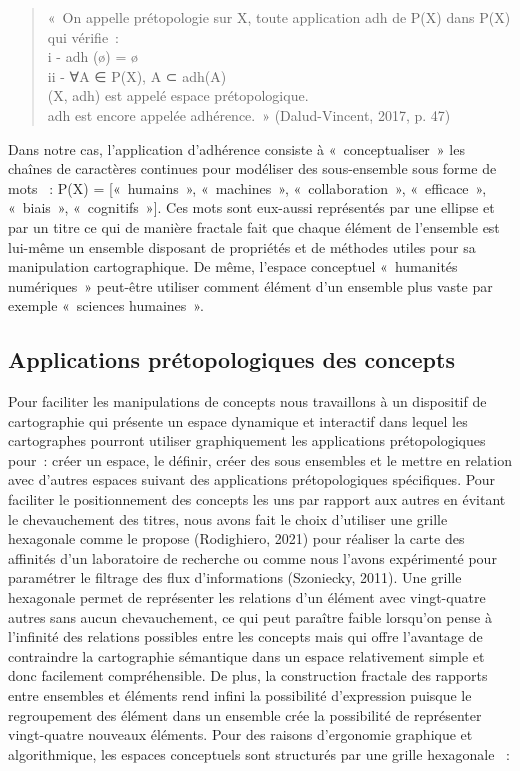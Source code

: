 \documentclass[
  a4paper,
  DIV=11,
  numbers=noendperiod]{scrreprt}
\begin{document}
\begin{quote}
«~On appelle prétopologie sur X, toute application adh de P(X) dans P(X)
qui vérifie~:\\
i - adh (ø) = ø\\
ii - ∀A ∈ P(X), A ⊂ adh(A)\\
(X, adh) est appelé espace prétopologique.\\
adh est encore appelée adhérence.~» (Dalud-Vincent, 2017, p. 47)
\end{quote}

Dans notre cas, l'application d'adhérence consiste à «~conceptualiser~»
les chaînes de caractères continues pour modéliser des sous-ensemble
sous forme de mots ~: P(X) = {[}«~humains~», «~machines~»,
«~collaboration~», «~efficace~», «~biais~», «~cognitifs~»{]}. Ces mots
sont eux-aussi représentés par une ellipse et par un titre ce qui de
manière fractale fait que chaque élément de l'ensemble est lui-même un
ensemble disposant de propriétés et de méthodes utiles pour sa
manipulation cartographique. De même, l'espace conceptuel «~humanités
numériques~» peut-être utiliser comment élément d'un ensemble plus vaste
par exemple «~sciences humaines~».

\subsection{Applications prétopologiques des
concepts}\label{sec-applicationsPretopologique}

Pour faciliter les manipulations de concepts nous travaillons à un
dispositif de cartographie qui présente un espace dynamique et
interactif dans lequel les cartographes pourront utiliser graphiquement
les applications prétopologiques pour~: créer un espace, le définir,
créer des sous ensembles et le mettre en relation avec d'autres espaces
suivant des applications prétopologiques spécifiques. Pour faciliter le
positionnement des concepts les uns par rapport aux autres en évitant le
chevauchement des titres, nous avons fait le choix d'utiliser une grille
hexagonale comme le propose (Rodighiero, 2021) pour réaliser la carte
des affinités d'un laboratoire de recherche ou comme nous l'avons
expérimenté pour paramétrer le filtrage des flux d'informations
(Szoniecky, 2011). Une grille hexagonale permet de représenter les
relations d'un élément avec vingt-quatre autres sans aucun
chevauchement, ce qui peut paraître faible lorsqu'on pense à l'infinité
des relations possibles entre les concepts mais qui offre l'avantage de
contraindre la cartographie sémantique dans un espace relativement
simple et donc facilement compréhensible. De plus, la construction
fractale des rapports entre ensembles et éléments rend infini la
possibilité d'expression puisque le regroupement des élément dans un
ensemble crée la possibilité de représenter vingt-quatre nouveaux
éléments. Pour des raisons d'ergonomie graphique et algorithmique, les
espaces conceptuels sont structurés par une grille hexagonale ~:
\end{document}
